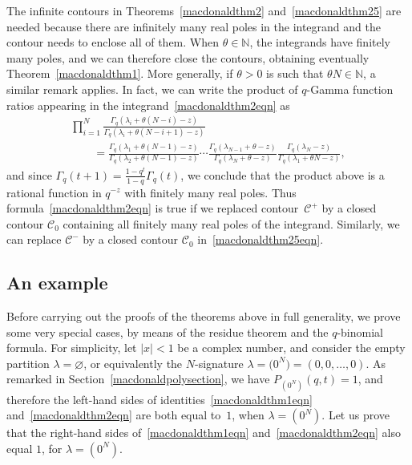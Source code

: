 \documentclass[pdftex]{sigma}
\numberwithin{equation}{section}
\newcommand{\N}{\mathbb{N}}
\newcommand{\CC}{\mathcal{C}}
\begin{document}
\begin{rem}\label{macdonaldthetaNinteger}
The inf\/inite contours in Theorems~\ref{macdonaldthm2} and~\ref{macdonaldthm25} are needed because there are inf\/initely many real poles in the integrand and the contour needs to enclose all of them. When $\theta\in\N$, the integrands have f\/initely many poles, and we can therefore close the contours, obtaining eventually Theorem~\ref{macdonaldthm1}. More generally, if $\theta > 0$ is such that $\theta N \in\N$, a similar remark applies. In fact, we can write the product of $q$-Gamma function ratios appearing in the integrand~\eqref{macdonaldthm2eqn} as
\begin{gather}
\prod_{i=1}^N{\frac{\Gamma_q(\lambda_i + \theta(N-i)-z)}{\Gamma_q(\lambda_i + \theta(N-i+1)-z)}}\nonumber\\
 \qquad{} = \frac{\Gamma_q(\lambda_1 + \theta(N-1) - z)}{\Gamma_q(\lambda_2 + \theta(N-1)-z)}\cdots\frac{\Gamma_q(\lambda_{N-1} + \theta - z)}{\Gamma_q(\lambda_N + \theta-z)}\frac{\Gamma_q(\lambda_N - z)}{\Gamma_q(\lambda_1 + \theta N - z)},\label{ratioqgammas}
\end{gather}
and since $\Gamma_q(t+1) = \frac{1 - q^t}{1 - q}\Gamma_q(t)$, we conclude that the product above is a rational function in $q^{-z}$ with f\/initely many real poles. Thus formula~\eqref{macdonaldthm2eqn} is true if we replaced contour~$\CC^+$ by a closed contour $\CC_0$ containing all f\/initely many real poles of the integrand. Similarly, we can replace $\CC^-$ by a closed contour $\CC_0$ in~\eqref{macdonaldthm25eqn}.
\end{rem}

\subsection{An example}

Before carrying out the proofs of the theorems above in full generality, we prove some very special cases, by means of the residue theorem and the $q$-binomial formula. For simplicity, let $|x| < 1$ be a complex number, and consider the empty partition $\lambda = \varnothing$, or equivalently the $N$-signature $\lambda = \big(0^N\big) = (0, 0, \dots, 0)$. As remarked in Section~\ref{macdonaldpolysection}, we have $P_{(0^N)}(q, t) = 1$, and therefore the left-hand sides of identities~\eqref{macdonaldthm1eqn} and~\eqref{macdonaldthm2eqn} are both equal to~$1$, when $\lambda = (0^N)$. Let us prove that the right-hand sides of~\eqref{macdonaldthm1eqn} and~\eqref{macdonaldthm2eqn} also equal $1$, for $\lambda = (0^N)$.
\end{document}
